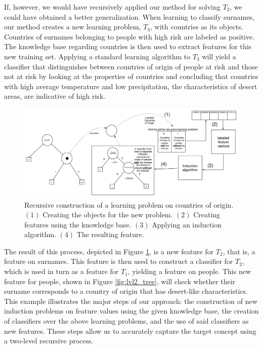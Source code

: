 \documentclass[twoside,11pt]{article}
\theoremstyle{definition}
\begin{document}
If, however, we would have recursively applied our method for solving $T_2$, we could have obtained a better generalization.
When learning to classify surnames, our method creates a new learning problem, $T_3$, with countries as its objects. Countries of surnames belonging to people with high risk are labeled as positive. The knowledge base regarding countries is then used to extract features for this new training set.
Applying a standard learning algorithm to $T_3$ will yield a classifier that distinguishes between countries of origin of people at risk and those not at risk by looking at the properties of countries and concluding that countries with high average temperature and low precipitation, the characteristics of desert areas,  are indicative of high risk. 

\begin{figure}[th]
	\centering
	\includegraphics[width=0.9\linewidth,height=0.33\linewidth]{fig4_annotated.pdf}
	\caption{Recursive construction of a learning problem on countries of origin. $(1)$ Creating the objects for the new problem. $(2)$ Creating features using the knowledge base. $(3)$ Applying an induction algorithm. $(4)$ The resulting feature.}
	\label{fig:moving_to_lvl2}
\end{figure}

The result of this process, depicted in Figure \ref{fig:moving_to_lvl2}, is a new feature for $T_2$, that is, a feature on surnames. This feature is then used to construct a classifier for $T_2$, which is used in turn as a feature for $T_1$, yielding a feature on people. This new feature for people, shown in Figure \ref{fig:lvl2_tree}, will check whether their surname corresponds to a country of origin that has desert-like characteristics. 
This example illustrates the major steps of our approach: the construction of new induction problems on feature values using the given knowledge base, the creation of classifiers over the above learning problems, and the use of said classifiers as new features. These steps allow us to accurately capture the target concept using a two-level recursive process.
\end{document}
